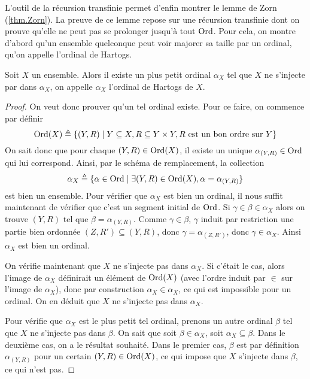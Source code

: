 L'outil de la récursion transfinie permet d'enfin montrer le lemme de Zorn
(\cref{thm.Zorn}). La preuve de ce lemme repose sur une récursion transfinie
dont on prouve qu'elle ne peut pas se prolonger jusqu'à tout $\operatorname{Ord}$. Pour cela,
on montre d'abord qu'un ensemble quelconque peut voir majorer sa taille par un
ordinal, qu'on appelle l'ordinal de Hartogs.

\begin{definition}
  Soit $X$ un ensemble. Alors il existe un plus petit ordinal $\alpha_X$ tel
  que $X$ ne s'injecte par dans $\alpha_X$, on appelle $\alpha_X$ l'ordinal
  de Hartogs de $X$.
\end{definition}

\begin{proof}
  On veut donc prouver qu'un tel ordinal existe. Pour ce faire, on commence par
  définir
  \[\operatorname{Ord}(X) \triangleq \{(Y,R)\mid
  Y\subseteq X, R\subseteq Y\times Y, R\text{ est un bon ordre sur }Y\}\]
  On sait donc que pour chaque $(Y,R)\in\operatorname{Ord}(X)$, il existe un unique
  $\alpha_{(Y,R)}\in\operatorname{Ord}$ qui lui correspond. Ainsi, par le schéma de
  remplacement, la collection
  \[\alpha_X \triangleq \{\alpha \in \operatorname{Ord}\mid \exists (Y,R) \in \operatorname{Ord}(X),
  \alpha = \alpha_{(Y,R)}\}\]
  est bien un ensemble. Pour vérifier que $\alpha_X$ est bien un ordinal, il
  nous suffit maintenant de vérifier que c'est un segment initial de $\operatorname{Ord}$.
  Si $\gamma\in\beta\in\alpha_X$ alors on trouve $(Y,R)$ tel que
  $\beta = \alpha_{(Y,R)}$. Comme $\gamma\in\beta$, $\gamma$ induit
  par restriction une partie bien ordonnée $(Z,R')\subseteq (Y,R)$, donc
  $\gamma = \alpha_{(Z,R')}$, donc $\gamma\in \alpha_X$. Ainsi $\alpha_X$ est
  bien un ordinal.

  On vérifie maintenant que $X$ ne s'injecte pas dans $\alpha_X$. Si c'était le
  cas, alors l'image de $\alpha_X$ définirait un élément de $\operatorname{Ord}(X)$ (avec
  l'ordre induit par $\in$ sur l'image de $\alpha_X$), donc par construction
  $\alpha_X\in\alpha_X$, ce qui est impossible pour un ordinal. On en déduit
  que $X$ ne s'injecte pas dans $\alpha_X$.

  Pour vérifie que $\alpha_X$ est le plus petit tel ordinal, prenons un autre
  ordinal $\beta$ tel que $X$ ne s'injecte pas dans $\beta$. On sait que
  soit $\beta \in \alpha_X$, soit $\alpha_X\subseteq \beta$. Dans le deuxième
  cas, on a le résultat souhaité. Dans le premier cas, $\beta$ est par
  définition $\alpha_{(Y,R)}$ pour un certain $(Y,R)\in\operatorname{Ord}(X)$, ce qui impose
  que $X$ s'injecte dans $\beta$, ce qui n'est pas.
\end{proof}

